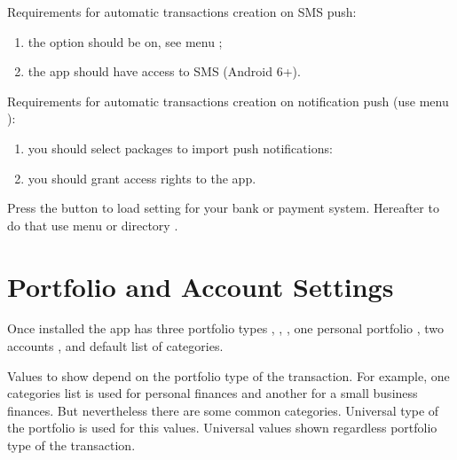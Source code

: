 \documentclass[a4paper,10pt,english]{sphinxmanual}
\begin{document}
\sphinxAtStartPar
Requirements for automatic transactions creation on SMS push:
\begin{enumerate}
%
\item {} 
\sphinxAtStartPar
the option should be on, see menu ;

\item {} 
\sphinxAtStartPar
the app should have access to SMS (Android 6+).

\end{enumerate}

\sphinxAtStartPar
Requirements for automatic transactions creation on notification push (use menu ):
\begin{enumerate}
%
\item {} 
\sphinxAtStartPar
you should select packages to import push notifications:

\item {} 
\sphinxAtStartPar
you should grant access rights to the app.

\end{enumerate}

\sphinxAtStartPar
Press the button  to load setting for your bank or payment system. Hereafter
to do that use menu  or directory
.

\noindent{}

\noindent{}


\section{Portfolio and Account Settings}
\label{\detokenize{getting-started:portfolio-and-account-settings}}
\sphinxAtStartPar
Once installed the app has three portfolio types , , ,
one personal portfolio , two accounts ,  and default list of categories.

\sphinxAtStartPar
Values to show depend on the portfolio type of the transaction.  For example,
one categories list is used for personal finances and another for a small business finances.
But nevertheless there are some common categories. Universal type of the portfolio is used
for this values. Universal values shown regardless portfolio type of the transaction.
\end{document}
